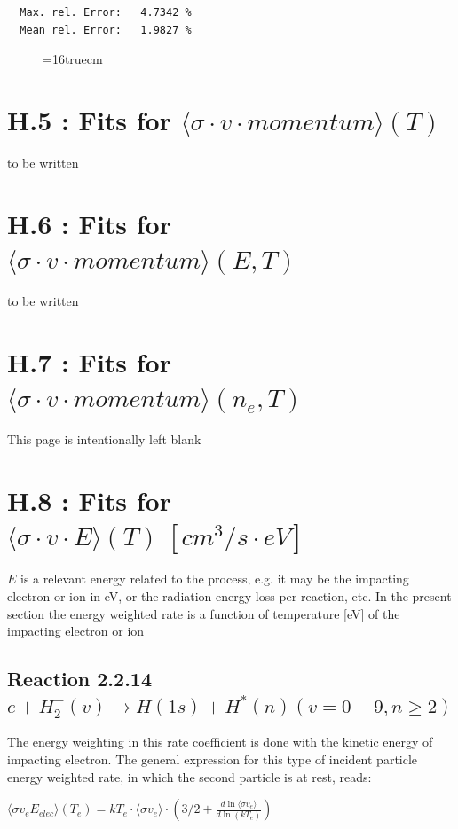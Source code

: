 \documentclass[12pt,dvips]{article}
\begin{document}
\begin{small}
\begin{verbatim}
  Max. rel. Error:   4.7342 %
  Mean rel. Error:   1.9827 %
\end{verbatim}\end{small}
\begin{figure} \label{7.2.3b}
\epsfxsize=16truecm
\end{figure}
\newpage

\section{H.5 : Fits for $\langle\sigma \cdot v \cdot momentum \rangle (T) $}

to be written

\section{H.6 : Fits for $\langle\sigma \cdot v \cdot momentum \rangle (E,T) $ }


to be written

\section{H.7 : Fits for $\langle\sigma \cdot v \cdot momentum \rangle (n_e,T) $ }

\newpage
This page is intentionally left blank
\newpage

\section{H.8 : Fits for $\langle\sigma \cdot v \cdot E \rangle (T) \ [cm^3/s
\cdot eV]$}

$E$ is a relevant energy related to the process, e.g. it may be the impacting electron or ion in eV,
or the radiation energy loss per reaction, etc.
In the present section
the energy weighted rate is a function of temperature [eV] of the
impacting electron or ion

\subsection{
Reaction 2.2.14   $e + H_2^+(v) \rightarrow H(1s) + H^*(n)   (v=0-9, n \ge 2) $
}
The energy weighting in this rate coefficient is done with the kinetic energy of
impacting electron. The general expression for this type of incident particle energy weighted
rate, in which the second particle is at rest, reads:

$\langle\sigma v_e E_{elec}\rangle(T_e) = kT_e \cdot \langle\sigma v_e\rangle \cdot
\left(3/2 + \frac{d \ln \langle\sigma v_e\rangle}{d \ln(kT_e)}\right)$
\end{document}
